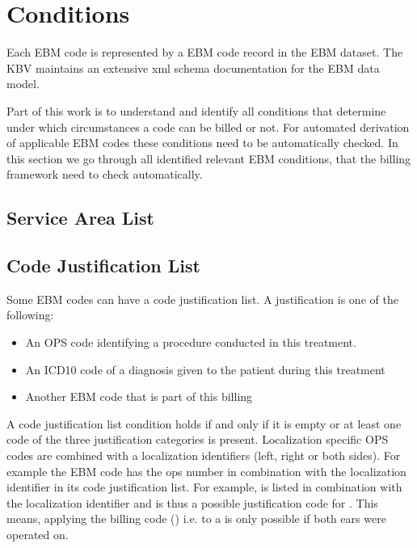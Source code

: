 \section{Conditions}\label{sec:conditions}


Each EBM code is represented by a EBM code record in the EBM dataset.
The KBV maintains an extensive xml schema documentation for the EBM data model.


Part of this work is to understand and identify all conditions that determine under which circumstances a code can be billed or not.
For automated derivation of applicable EBM codes these conditions need to be automatically checked.
In this section we go through all identified relevant EBM conditions, that the billing framework need to check automatically.


\subsection{Service Area List}


\subsection{Code Justification List}
Some EBM codes can have a code justification list.
A justification is one of the following:
\begin{itemize}
    \item An OPS code identifying a procedure conducted in this treatment.
    \item An ICD10 code of a diagnosis given to the patient during this treatment
    \item Another EBM code that is part of this billing
\end{itemize}
A code justification list condition holds if and only if it is empty or at least one code of the three justification categories is present.
Localization specific OPS codes are combined with a localization identifiers (left, right or both sides).
For example the EBM code  has the ops number  in combination with the  localization identifier in its code justification list.
For example,  is listed in combination with the  localization identifier and is thus a possible justification code for .
This means, applying the billing code  () i.e.  to a  is only possible if both ears were operated on.

